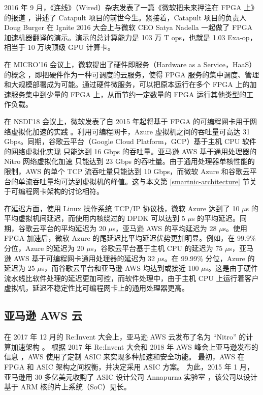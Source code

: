 2016 年 9 月，《连线》（Wired）杂志发表了一篇《微软把未来押注在 FPGA 上》的报道 \cite{microsoft-wired-fpga}，讲述了 Catapult 项目的前世今生。紧接着，Catapult 项目的负责人 Doug Burger 在 Ignite 2016 大会上与微软 CEO Satya Nadella 一起做了 FPGA 加速机器翻译的演示。演示的总计算能力是 103 万 T ops，也就是 1.03 Exa-op，相当于 10 万块顶级 GPU 计算卡。

在 MICRO'16 会议上，微软提出了硬件即服务（Hardware as a Service，HaaS）的概念 \cite{configurable-cloud-acceleration}，即把硬件作为一种可调度的云服务，使得 FPGA 服务的集中调度、管理和大规模部署成为可能。通过硬件微服务，可以把原本运行在多个 FPGA 上的加速服务集中到少量的 FPGA 上，从而节约一定数量的 FPGA 运行其他类型的工作负载。

在 NSDI'18 会议上，微软发表了自 2015 年起将基于 FPGA 的可编程网卡用于网络虚拟化加速的实践 \cite{smartnic}。利用可编程网卡，Azure 虚拟机之间的吞吐量可高达 31 Gbps。同期，谷歌云平台（Google Cloud Platform，GCP）基于主机 CPU 软件的网络虚拟化实现 \cite{andromeda} 只能达到 16 Gbps 的吞吐量。亚马逊 AWS 基于通用处理器的 Nitro 网络虚拟化加速 \cite{nitro-talk} 只能达到 23 Gbps 的吞吐量。由于通用处理器单核性能的限制，AWS 的单个 TCP 流吞吐量只能达到 10 Gbps，而微软 Azure 和谷歌云平台的单流吞吐量均可达到虚拟机的峰值。这与本文第 \ref{smartnic-architecture} 节关于可编程网卡架构的讨论相符。

在延迟方面，使用 Linux 操作系统 TCP/IP 协议栈，微软 Azure 达到了 10 $\mu$s 的平均虚拟机间延迟，而使用内核绕过的 DPDK \cite{dpdk} 可以达到 5 $\mu$s 的平均延迟。同期，谷歌云平台的平均延迟为 20 $\mu$s，亚马逊 AWS 的平均延迟为 28 $\mu$s。使用 FPGA 加速后，微软 Azure 的尾延迟比平均延迟优势更加明显。例如，在 99.9\% 分位，Azure 的延迟为 20 $\mu$s，谷歌云平台基于主机 CPU 的延迟为 75 $\mu$s，亚马逊 AWS 基于可编程网卡通用处理器的延迟为 32 $\mu$s。在 99.99\% 分位，Azure 的延迟为 25 $\mu$s，而谷歌云平台和亚马逊 AWS 均达到或接近 100 $\mu$s。这是由于硬件流水线比软件处理的延迟更加可控，而软件处理中，由于主机 CPU 上运行着客户虚拟机，延迟不稳定性比可编程网卡上的通用处理器更高。



\subsection{亚马逊 AWS 云}

在 2017 年 12 月的 Re:Invent 大会上，亚马逊 AWS 云发布了名为 ``Nitro'' 的计算加速架构 \cite{nitro-blog}。
根据 2017 年 Re:Invent 大会和 2018 年 AWS 峰会上亚马逊发布的信息 \cite{nitro-talk,nitro-web}，AWS 使用了定制 ASIC 来实现多种加速和安全功能。
最初，AWS 在 FPGA 和 ASIC 架构之间权衡，并决定采用 ASIC 方案。
为此，2015 年 1 月，亚马逊用 30 多亿美元收购了 ASIC 设计公司 Annapurna 实验室 \cite{annapurna}，该公司以设计基于 ARM 核的片上系统（SoC）见长。

